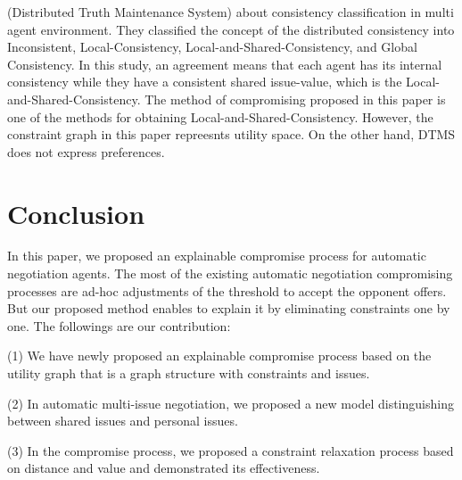 \documentclass[paper]{ieice}
\begin{document}
(Distributed Truth Maintenance System) about consistency classification in multi agent environment. They classified the concept of the distributed consistency into Inconsistent, Local-Consistency, Local-and-Shared-Consistency, and Global Consistency. In this study, an agreement means that each agent has its internal consistency while they have a consistent shared issue-value, which is the Local-and-Shared-Consistency. The method of compromising proposed in this paper is one of the methods for obtaining Local-and-Shared-Consistency. However, the constraint graph in this paper repreesnts utility space. On the other hand, DTMS does not express preferences. 


\section{Conclusion}
In this paper, we proposed  an explainable compromise process for automatic negotiation agents. The most of the existing automatic negotiation compromising processes are  ad-hoc adjustments of the threshold to accept the opponent offers. But our proposed method enables to explain it by eliminating constraints one by one. The followings are our contribution:

(1) We have newly proposed an explainable compromise process based on the utility graph that is a graph structure with constraints and issues. 

(2) In automatic multi-issue negotiation, we proposed a new model distinguishing between shared issues and personal issues.

(3) In the compromise process, we proposed a constraint relaxation process based on distance and value and demonstrated its effectiveness.









\end{document}
